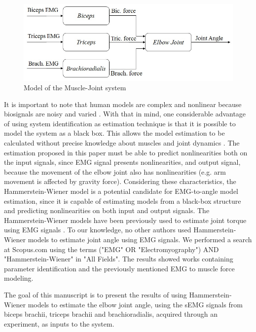 \documentclass[letterpaper, 10 pt, conference]{ieeeconf}  %
\begin{document}
\begin{figure}[h]
      \centering
      \includegraphics[width=0.98\columnwidth]{Images/Mechanical_Model.jpg}
      \caption{Model of the Muscle-Joint system}
      \label{ModelMuscle-Joint}
   \end{figure}

It is important to note that human models are complex and nonlinear because biosignals are noisy and varied  \cite{kato2015}. With that in mind, one considerable advantage of using system identification as estimation technique is that it is possible to model the system as a black box. This allows the model estimation to be calculated without precise knowledge about muscles and joint dynamics \cite{Abbasi-Asl2011}. The estimation proposed in this paper must be able to predict nonlinearities both on the input signals, since EMG signal presents nonlinearities, and output signal, because the movement of the elbow joint also has nonlinearities (e.g. arm movement is affected by gravity force). Considering these characteristics, the Hammerstein-Wiener model is a potential candidate for EMG-to-angle model estimation, since it is capable of estimating models from a black-box structure and predicting nonlinearities on both input and output signals. The Hammerstein-Wiener models have been previously used to estimate joint torque using EMG signals \cite{Abbasi-Asl2011,sab2010,clancy2012}. To our knowledge, no other authors used Hammerstein-Wiener models to estimate joint angle using EMG signals. We performed a search at Scopus.com using the terms ("EMG" OR "Electromyography") AND "Hammerstein-Wiener" in "All Fields". The results showed works containing parameter identification and the previously mentioned EMG to muscle force modeling.

The goal of this manuscript is to present the results of using Hammerstein-Wiener models to estimate the elbow joint angle, using the sEMG signals from biceps brachii, triceps brachii and brachioradialis, acquired through an experiment, as inputs to the system.
\end{document}
